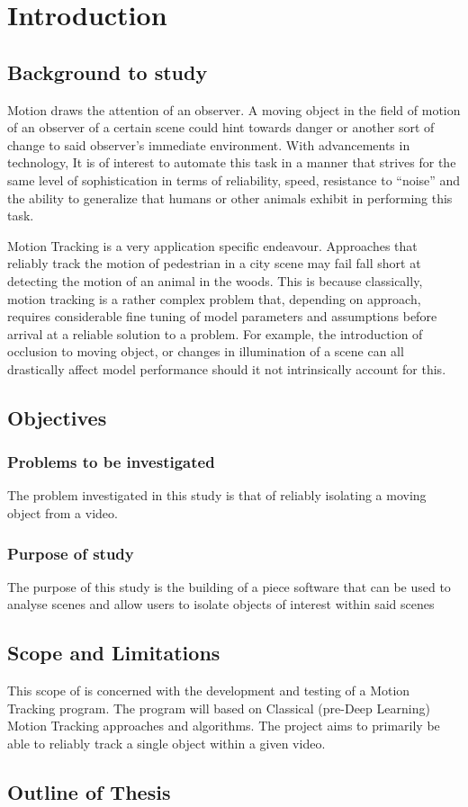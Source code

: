 \chapter{Introduction}

\section{Background to study}
Motion draws the attention of an observer. A moving object in the field of
motion of an observer of a certain scene could hint towards danger or another
sort of change to said observer's immediate environment. With advancements in technology,
It is of interest to automate this task in a manner that strives for the same
level of sophistication in terms of reliability, speed, resistance to ``noise''
and the ability to generalize that humans or other animals exhibit in performing
this task.

Motion Tracking is a very application specific endeavour. Approaches that
reliably track the motion of pedestrian in a city scene may fail fall short at
detecting the motion of an animal in the woods. This is because classically,
motion tracking is a rather complex problem that, depending on approach,
requires considerable fine tuning of model parameters and assumptions before
arrival at a reliable solution to a problem.  For example, the introduction of
occlusion to moving object, or changes in illumination of a scene can all
drastically affect model performance should it not intrinsically account for
this.

\section{Objectives}\label{introduction_objectives}
\subsection{Problems to be investigated}
The problem investigated in this study is that of reliably isolating a moving
object from a video.

\subsection{Purpose of study}
The purpose of this study is the building of a piece software that can be used
to analyse scenes and allow users to isolate objects of interest within said
scenes

\section{Scope and Limitations}
This scope of is concerned with the development and testing of a Motion Tracking
program. The program will based on Classical (pre-Deep Learning) Motion Tracking
approaches and algorithms.
The project aims to primarily be able to reliably track a single object within a
given video.

\section{Outline of Thesis}

